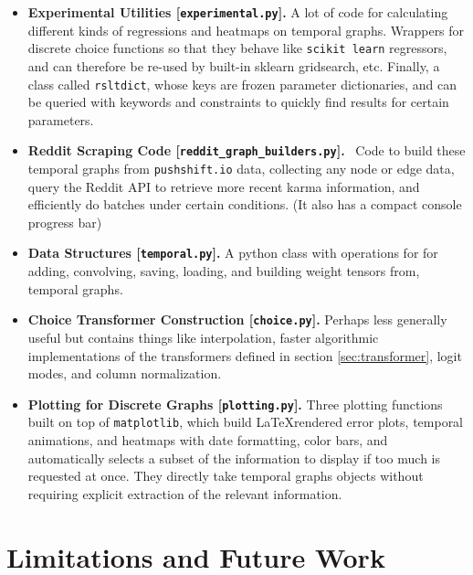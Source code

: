 \documentclass{article}
\theoremstyle{definition}
\begin{document}
	\begin{itemize}
		\item \textbf{Experimental Utilities [\texttt{experimental.py}].} A lot of code for calculating different kinds of regressions and heatmaps on temporal graphs. Wrappers for discrete choice functions so that they behave like \texttt{scikit learn} regressors, and can therefore be re-used by built-in sklearn gridsearch, etc. Finally, a class called \texttt{rsltdict}, whose keys are frozen parameter dictionaries, and can be queried with keywords and constraints to quickly find results for certain parameters.
		
		\item \textbf{Reddit Scraping Code [\texttt{reddit\_graph\_builders.py}].}~ Code to build these temporal graphs from \texttt{pushshift.io} data, collecting any node or edge data, query the Reddit API to retrieve more recent karma information, and efficiently do batches under certain conditions. (It also has a compact console progress bar)
		
		\item \textbf{Data Structures [\texttt{temporal.py}].} A python class with operations for for adding, convolving, saving, loading, and building weight tensors from, temporal graphs.
		
		
		\item \textbf{Choice Transformer Construction [\texttt{choice.py}].} Perhaps less generally useful but contains things like interpolation, faster algorithmic implementations of the transformers defined in section \ref{sec:transformer}, logit modes, and column normalization.
		
		\item \textbf{Plotting for Discrete Graphs [\texttt{plotting.py}].} Three plotting functions built on top of \texttt{matplotlib}, which build \LaTeX rendered error plots, temporal animations, and heatmaps with date formatting, color bars, and automatically selects a subset of the information to display if too much is requested at once. They directly take temporal graphs objects without requiring explicit extraction of the relevant information.
	\end{itemize}

	
	\section{Limitations and Future Work}
	
\end{document}
